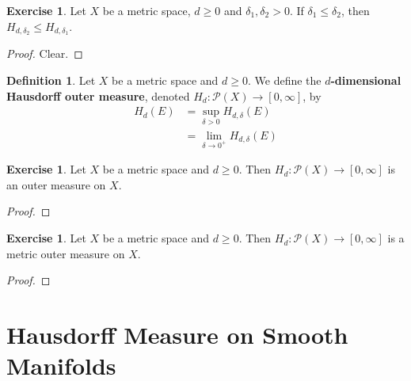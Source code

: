 \documentclass{book}
\theoremstyle{definition}
\newtheorem{defn}[definition]{Definition}
\newtheorem{ex}[definition]{Exercise}
\newcommand{\del}{\delta}
\newcommand{\MP}{\mathcal{P}}
\DeclareMathOperator*{\0}{\mbf{0}}
\DeclareMathOperator*{\1}{\mbf{1}}
\begin{document}
	\begin{ex}
	Let $X$ be a metric space, $d \geq 0$ and $\del_1, \del_2 >0$. If $\del_1 \leq \del_2$, then $H_{d, \del_2} \leq H_{d, \del_1}$.
	\end{ex}
	
	\begin{proof}
	Clear.
	\end{proof}
	
	\begin{defn}
	Let $X$ be a metric space and $d \geq 0$. We define the \textbf{$d$-dimensional Hausdorff outer measure}, denoted $H_{d}: \MP(X) \rightarrow [0, \infty]$, by 
	\begin{align*}
	H_{d}(E) 
	&= \sup_{\del > 0} H_{d, \del}(E) \\
	&= \lim_{\del \rightarrow 0^+} H_{d, \del}(E)
	\end{align*}
	\end{defn}
	
	\begin{ex}
	Let $X$ be a metric space and $d \geq 0$. Then $H_d: \MP(X) \rightarrow [0, \infty]$ is an outer measure on $X$.
	\end{ex}
	
	\begin{proof}
	
	\end{proof}
	
	\begin{ex}
	Let $X$ be a metric space and $d \geq 0$. Then $H_d: \MP(X) \rightarrow [0, \infty]$ is a metric outer measure on $X$.
	\end{ex}
	
	\begin{proof}
	
	\end{proof}
	
	
	
	
	
	
	
	
	
	
	
	
	
	
	
	
	
	
	\newpage
	\section{Hausdorff Measure on Smooth Manifolds}
	
	
	
	
	
	
	
\end{document}
